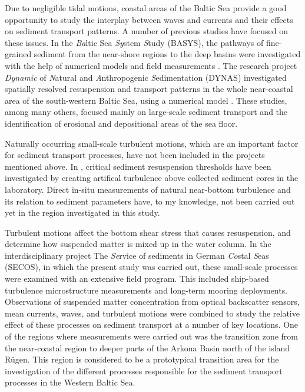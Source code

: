 Due to negligible tidal motions, coastal areas of the Baltic 
Sea provide a good opportunity to study the interplay between waves and 
currents and their effects on sediment transport patterns. A number of previous 
studies have focused on these issues.
In the \textit{Ba}ltic Sea \textit{Sy}stem \textit{S}tudy (BASYS), the 
pathways of fine-grained sediment from the near-shore regions to the deep 
basins were investigated with the help of numerical models and field 
measurements \citep[][]{basys1, basys2, leipe2000}. The research project 
\textit{Dynamic} of \textit{N}atural and \textit{A}nthropogenic 
\textit{S}edimentation (DYNAS) investigated spatially resolved 
resuspension and transport patterns in the whole near-coastal area of the 
south-western Baltic Sea, using a numerical model 
\citep[][]{dynas1, dynas2}. These studies, among many others, focused mainly 
on large-scale sediment transport and the identification of erosional and 
depositional areas of the sea floor. 

Naturally occurring small-scale turbulent motions, which are an important 
factor for sediment transport processes, have not been included in the projects 
mentioned above. In \cite{basys1}, critical sediment resuspension thresholds 
have been investigated by creating artifical turbulence above collected 
sediment cores in the laboratory. Direct in-situ measurements of natural 
near-bottom 
turbulence and its relation to sediment parameters have, to my knowledge, not 
been carried out yet in the region investigated in this study. 

Turbulent motions affect the bottom 
shear stress that causes resuspension, and determine how 
suspended matter is mixed up in the water column. In the interdisciplinary 
project The \textit{Se}rvice of sediments in German \textit{Co}stal 
\textit{S}eas (SECOS), in which the present study was carried out, these 
small-scale processes were examined with an extensive field program. This 
included ship-based turbulence microstructure measurements and long-term 
mooring 
deployments. Observations of suspended matter concentration 
from optical backscatter sensors, mean currents, waves, and turbulent 
motions were combined to study the relative effect of these processes on 
sediment transport at a number of key locations. One of the regions where 
measurements were carried out was the 
transition zone from the near-coastal region to deeper parts of the Arkona 
Basin north of the island 
R\"{u}gen. This region is considered to be a prototypical transition area for 
the 
investigation of the different processes responsible for the sediment transport 
processes in the Western Baltic Sea. 
 
